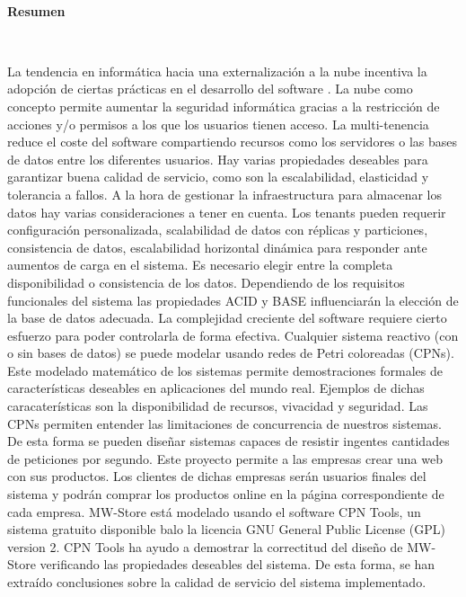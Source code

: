 \documentclass[12pt,english]{article} %
\begin{document}
\

\textbf{Resumen}

\

La tendencia en informática hacia una externalización a la nube incentiva la adopción de ciertas prácticas en el desarrollo del software \cite{cloud-computing-state-of-the-art}.
La nube como concepto permite aumentar la seguridad informática gracias a la restricción de acciones y/o permisos a los que los usuarios tienen acceso.
La multi-tenencia reduce el coste del software compartiendo recursos como los servidores o las bases de datos entre los diferentes usuarios.
Hay varias propiedades deseables para garantizar buena calidad de servicio, como son la escalabilidad, elasticidad y tolerancia a fallos.
A la hora de gestionar la infraestructura para almacenar los datos hay varias consideraciones a tener en cuenta.
Los tenants pueden requerir configuración personalizada, scalabilidad de datos con réplicas y particiones, consistencia de datos, escalabilidad horizontal dinámica para responder ante aumentos de carga en el sistema.
Es necesario elegir entre la completa disponibilidad o consistencia de los datos.
Dependiendo de los requisitos funcionales del sistema las propiedades ACID y BASE influenciarán la elección de la base de datos adecuada.
La complejidad creciente del software requiere cierto esfuerzo para poder controlarla de forma efectiva.
Cualquier sistema reactivo (con o sin bases de datos) se puede modelar usando redes de Petri coloreadas (CPNs).
Este modelado matemático de los sistemas permite demostraciones formales de características deseables en aplicaciones del mundo real.
Ejemplos de dichas caracaterísticas son la disponibilidad de recursos, vivacidad y seguridad.
Las CPNs permiten entender las limitaciones de concurrencia de nuestros sistemas.
De esta forma se pueden diseñar sistemas capaces de resistir ingentes cantidades de peticiones por segundo. 
Este proyecto permite a las empresas crear una web con sus productos.
Los clientes de dichas empresas serán usuarios finales del sistema y podrán comprar los productos online en la página correspondiente de cada empresa.
MW-Store está modelado usando el software CPN Tools, un sistema gratuito disponible balo la licencia GNU General Public License (GPL) version 2.
CPN Tools ha ayudo a demostrar la correctitud del diseño de MW-Store verificando las propiedades deseables del sistema.
De esta forma, se han extraído conclusiones sobre la calidad de servicio del sistema implementado.


\newpage
\end{document}
